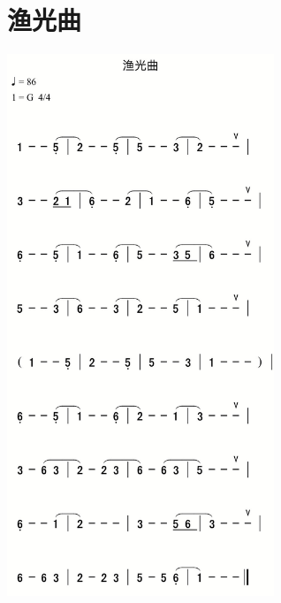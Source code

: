 \documentclass[cn,pad,chinese,chinesefont=nofont]{elegantbook}
\begin{document}
\section{渔光曲}           
	\includegraphics[width=0.6\textwidth]{dongxiao/IMG_0865-渔光曲.png}   
\end{document}
